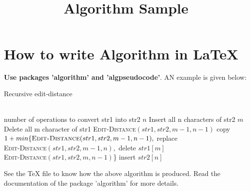 \documentclass[12pt]{article}
\begin{document}
\title{Algorithm Sample}

\maketitle

\section*{How to write Algorithm in LaTeX}

{\bf Use packages 'algorithm' and 'algpseudocode'}. AN example is given below:


\begin{algorithm}
  \caption{Recursive edit-distance}
  \begin{algorithmic}
    \\
    \Comment number of operations to convert str1 into str2
        \State \Return $n$  \Comment Insert all n characters of str2
      \EndIf
        \State \Return $m$  \Comment Delete all m character of str1
      \EndIf
        \State \Return \textsc{Edit-Distance}$(str1, str2, m-1, n-1)$ \Comment copy
      \EndIf
      \State \Return $1 + min\{\textsc{Edit-Distance}(str1, str2, m-1, n-1),$ \Comment replace\\
        \hspace{1.25in}\textsc{Edit-Distance}$(str1, str2, m-1, n),$ \Comment delete $str1[m]$\\
        \hspace{1.25in}\textsc{Edit-Distance}$(str1, str2, m, n-1)$\} \Comment insert $str2[n]$
    \EndProcedure
  \end{algorithmic}
\end{algorithm}

See the TeX file to know how the above algorithm is produced.
Read the documentation of the package 'algorithm' for more details.
\end{document}
